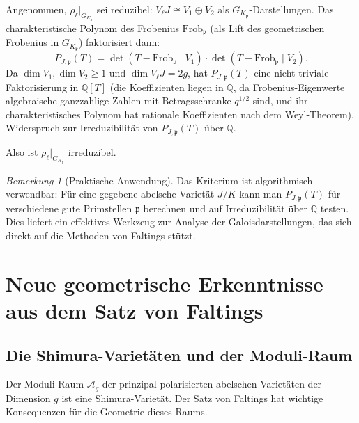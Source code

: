 ﻿\documentclass[12pt,a4paper]{article}
\theoremstyle{plain}
\theoremstyle{definition}
\theoremstyle{remark}
\newtheorem{remark}[theorem]{Bemerkung}
\newenvironment{proof*}[1][Beweis]{%
  \begin{proof}[#1]\renewcommand{\qedsymbol}{$\blacksquare$}}
  {\end{proof}}
\newcommand{\Q}{\mathbb{Q}}
\begin{document}
\begin{proof*}
Angenommen, $\rho_\ell|_{G_{K_\mathfrak{p}}}$ sei reduzibel:
$V_\ell J \cong V_1 \oplus V_2$ als $G_{K_\mathfrak{p}}$-Darstellungen.
Das charakteristische Polynom des Frobenius $\mathrm{Frob}_\mathfrak{p}$
(als Lift des geometrischen Frobenius in $G_{K_\mathfrak{p}}$) faktorisiert dann:
\[
  P_{J,\mathfrak{p}}(T) = \det(T - \mathrm{Frob}_\mathfrak{p} \mid V_1)
  \cdot \det(T - \mathrm{Frob}_\mathfrak{p} \mid V_2).
\]
Da $\dim V_1, \dim V_2 \geq 1$ und $\dim V_\ell J = 2g$, hat
$P_{J,\mathfrak{p}}(T)$ eine nicht-triviale Faktorisierung in $\Q[T]$
(die Koeffizienten liegen in $\Q$, da Frobenius-Eigenwerte algebraische
ganzzahlige Zahlen mit Betragsschranke $q^{1/2}$ sind, und ihr charakteristisches
Polynom hat rationale Koeffizienten nach dem Weyl-Theorem).
Widerspruch zur Irreduzibilität von $P_{J,\mathfrak{p}}(T)$ über $\Q$.

Also ist $\rho_\ell|_{G_{K_\mathfrak{p}}}$ irreduzibel.
\end{proof*}

\begin{remark}[Praktische Anwendung]\label{rem:praktisch}
Das Kriterium ist algorithmisch verwendbar: Für eine gegebene abelsche Varietät $J/K$
kann man $P_{J,\mathfrak{p}}(T)$ für verschiedene gute Primstellen $\mathfrak{p}$
berechnen und auf Irreduzibilität über $\Q$ testen.
Dies liefert ein effektives Werkzeug zur Analyse der Galoisdarstellungen,
das sich direkt auf die Methoden von Faltings stützt.
\end{remark}

\section{Neue geometrische Erkenntnisse aus dem Satz von Faltings}

\subsection{Die Shimura-Varietäten und der Moduli-Raum}

Der Moduli-Raum $\mathcal{A}_g$ der prinzipal polarisierten abelschen Varietäten der Dimension $g$
ist eine Shimura-Varietät. Der Satz von Faltings hat wichtige Konsequenzen für die
Geometrie dieses Raums.
\end{document}
